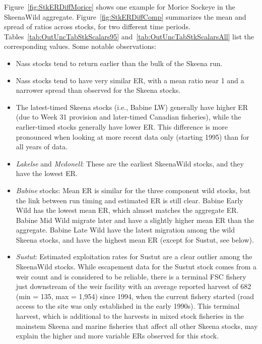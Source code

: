 \documentclass[french,11pt]{book}
\begin{document}
Figure~\ref{fig:StkERDiffMorice} shows one example for Morice Sockeye in the SkeenaWild aggregate. Figure~\ref{fig:StkERDiffComp} summarizes the mean and spread of ratios across stocks, for two different time periods. Tables~\ref{tab:OutUncTabStkScalars95} and~\ref{tab:OutUncTabStkScalarsAll} list the corresponding values. Some notable observations:
\begin{itemize}

\item
  Nass stocks tend to return earlier than the bulk of the Skeena run.
\item
  Nass stocks tend to have very similar ER, with a mean ratio near 1 and a narrower spread than observed for the Skeena stocks.
\item
  The latest-timed Skeena stocks (i.e., Babine LW) generally have higher ER (due to Week 31 provision and later-timed Canadian fisheries), while the earlier-timed stocks generally have lower ER. This difference is more pronounced when looking at more recent data only (starting 1995) than for all years of data.
\item
  \emph{Lakelse} and \emph{Mcdonell}: These are the earliest SkeenaWild stocks, and they have the lowest ER.
\item
  \emph{Babine} stocks: Mean ER is similar for the three component wild stocks, but the link between run timing and estimated ER is still clear. Babine Early Wild has the lowest mean ER, which almost matches the aggregate ER. Babine Mid Wild migrate later and have a slightly higher mean ER than the aggregate. Babine Late Wild have the latest migration among the wild Skeena stocks, and have the highest mean ER (except for Sustut, see below).
\item
  \emph{Sustut}: Estimated exploitation rates for Sustut are a clear outlier among the SkeenaWild stocks. While escapement data for the Sustut stock comes from a weir count and is considered to be reliable, there is a terminal FSC fishery just downstream of the weir facility with an average reported harvest of 682 (min = 135, max = 1,954) since 1994, when the current fishery started (road access to the site was only established in the early 1990s). This terminal harvest, which is additional to the harvests in mixed stock fisheries in the mainstem Skeena and marine fisheries that affect all other Skeena stocks, may explain the higher and more variable ERs observed for this stock.
\end{itemize}
\clearpage
\end{document}
